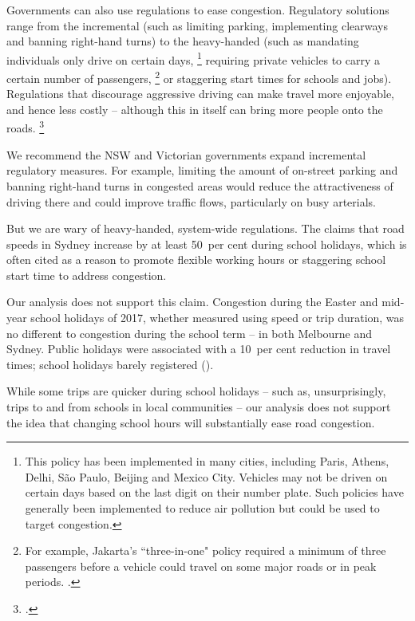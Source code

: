 \documentclass{grattan}
\begin{document}
Governments can also use regulations to ease congestion. Regulatory solutions range from the incremental (such as limiting parking, implementing clearways and banning right-hand turns) to the heavy-handed (such as mandating individuals only drive on certain days,%
    \footnote{This policy has been implemented in many cities, including Paris, Athens, Delhi, São Paulo, Beijing and Mexico City.
Vehicles may not be driven on certain days based on the last digit on their number plate.
Such policies have generally been implemented to reduce air pollution but could be used to target congestion.}
requiring private vehicles to carry a certain number of passengers,%
    \footnote{For example, Jakarta’s “three-in-one" policy required a minimum of three passengers before a vehicle could travel on some major roads  or in peak periods. \textcite{HOV-Jakarta}.}
or staggering start times for schools and jobs).
Regulations that discourage aggressive driving can make travel more enjoyable, and hence less costly -- although this in itself can bring more people onto the roads.%
\footcite[][10--11]{Arnott-2001-Microscopic-research-agenda}

We recommend the NSW and Victorian governments expand incremental regulatory measures.
For example, limiting the amount of on-street parking and banning right-hand turns in congested areas would reduce the attractiveness of driving there and could improve traffic flows, particularly on busy arterials.

But we are wary of heavy-handed, system-wide regulations. The \textcite{NRMA-SchoolHolidays-2013} claims that road speeds in Sydney increase by at least 50~per cent during school holidays, which is often cited as a reason to promote flexible working hours or staggering school start time to address congestion.



Our analysis does not support this claim.
Congestion during the Easter and mid-year school holidays of 2017, whether measured using speed or trip duration, was no different to congestion during the school term -- in both Melbourne and Sydney.
Public holidays were associated with a 10~per cent reduction in travel times; school holidays barely registered ().

While some trips are quicker during school holidays -- such as, unsurprisingly, trips to and from schools in local communities -- our analysis does not support the idea that changing school hours will substantially ease road congestion.
\end{document}
